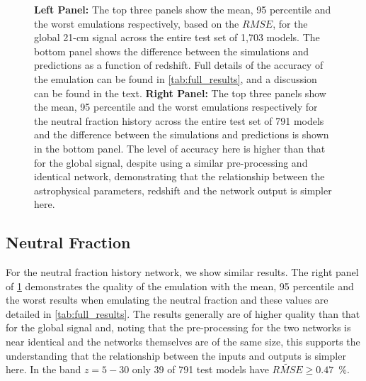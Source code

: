\begin{figure}
    \caption{\textbf{Left Panel:} The top three panels show the mean, 95 percentile and the worst emulations respectively, based on the $RMSE$, for the global 21-cm signal across the entire test set of 1,703 models. The bottom panel shows the difference between the simulations and predictions as a function of redshift. Full details of the accuracy of the emulation can be found in \cref{tab:full_results}, and a discussion can be found in the text. \textbf{Right Panel:} The top three panels show the mean, 95 percentile and the worst emulations respectively for the neutral fraction history across the entire test set of 791 models and the difference between the simulations and predictions is shown in the bottom panel. The level of accuracy here is higher than that for the global signal, despite using a similar pre-processing and identical network, demonstrating that the relationship between the astrophysical parameters, redshift and the network output is simpler here.}
    \label{fig:bestWorst}
\end{figure}

\subsection{Neutral Fraction}

For the neutral fraction history network, we show similar results. The right panel of \cref{fig:bestWorst} demonstrates the quality of the emulation with the mean, 95 percentile and the worst results when emulating the neutral fraction and these values are detailed in \cref{tab:full_results}. The results generally are of higher quality than that for the global signal and, noting that the pre-processing for the two networks is near identical and the networks themselves are of the same size, this supports the understanding that the relationship between the inputs and outputs is simpler here. In the band $z = 5 -30$ only 39 of 791 test models have $\widetilde{RMSE} \geq 0.47$~\%.

